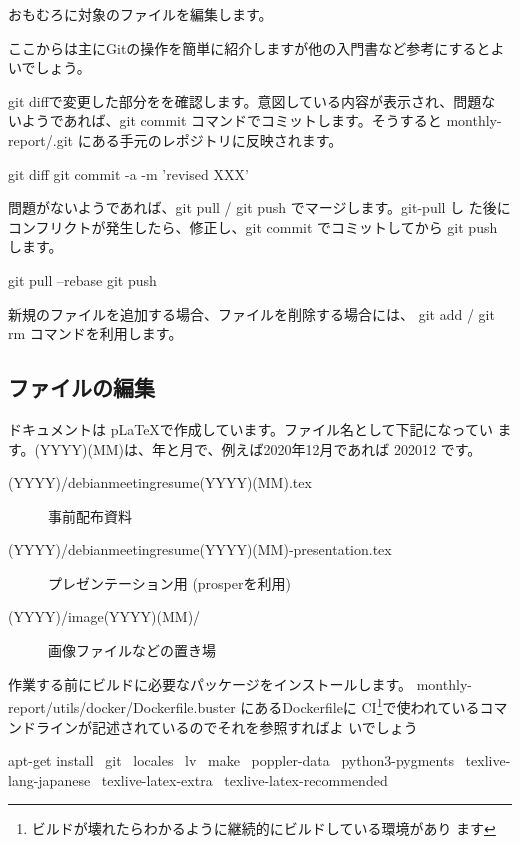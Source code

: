 \documentclass[mingoth,a4paper]{jsarticle}
\begin{document}
おもむろに対象のファイルを編集します。

ここからは主にGitの操作を簡単に紹介しますが他の入門書など参考にするとよいでしょう。

git diffで変更した部分をを確認します。意図している内容が表示され、問題な
いようであれば、git commit コマンドでコミットします。そうすると
monthly-report/.git にある手元のレポジトリに反映されます。

\begin{commandline}
 git diff
 git commit -a -m 'revised XXX'
\end{commandline}

問題がないようであれば、git pull / git push でマージします。git-pull し
た後にコンフリクトが発生したら、修正し、git commit でコミットしてから
git push します。

\begin{commandline}
 git pull --rebase
 git push 
\end{commandline}

新規のファイルを追加する場合、ファイルを削除する場合には、 git add /
git rm コマンドを利用します。

\subsection{ファイルの編集}

ドキュメントは p\LaTeX{}で作成しています。ファイル名として下記になってい
ます。(YYYY)(MM)は、年と月で、例えば2020年12月であれば 202012 です。

\begin{description}
 \item[(YYYY)/debianmeetingresume(YYYY)(MM).tex]
	    事前配布資料
 \item[(YYYY)/debianmeetingresume(YYYY)(MM)-presentation.tex]
	    プレゼンテーション用 (prosperを利用)
 \item[(YYYY)/image(YYYY)(MM)/]
	    画像ファイルなどの置き場
\end{description}

作業する前にビルドに必要なパッケージをインストールします。
monthly-report/utils/docker/Dockerfile.buster にあるDockerfileに
CI\footnote{ビルドが壊れたらわかるように継続的にビルドしている環境があり
ます}で使われているコマンドラインが記述されているのでそれを参照すればよ
いでしょう

\begin{commandline}
apt-get install \
    git \
    locales \
    lv \
    make \
    poppler-data \
    python3-pygments \
    texlive-lang-japanese \
    texlive-latex-extra \
    texlive-latex-recommended
\end{commandline}
\end{document}
